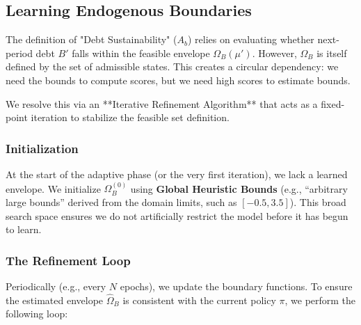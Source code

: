 \subsection{Learning Endogenous Boundaries}

The definition of "Debt Sustainability" ($A_b$) relies on evaluating whether next-period debt $B'$ falls within the feasible envelope $\Omega_B(\mu')$. However, $\Omega_B$ is itself defined by the set of admissible states. This creates a circular dependency: we need the bounds to compute scores, but we need high scores to estimate bounds.

We resolve this via an **Iterative Refinement Algorithm** that acts as a fixed-point iteration to stabilize the feasible set definition.

\subsubsection{Initialization}
At the start of the adaptive phase (or the very first iteration), we lack a learned envelope. We initialize $\Omega_B^{(0)}$ using \textbf{Global Heuristic Bounds} (e.g., ``arbitrary large bounds'' derived from the domain limits, such as $[-0.5, 3.5]$). This broad search space ensures we do not artificially restrict the model before it has begun to learn.

\subsubsection{The Refinement Loop}
Periodically (e.g., every $N$ epochs), we update the boundary functions. To ensure the estimated envelope $\hat{\Omega}_B$ is consistent with the current policy $\pi$, we perform the following loop:

